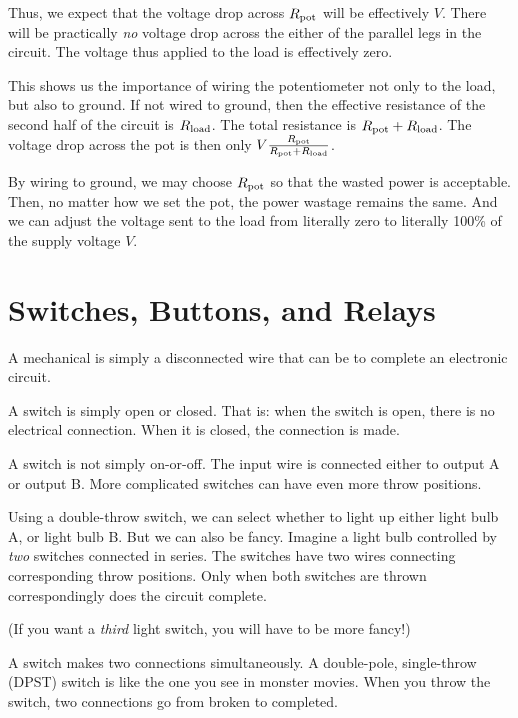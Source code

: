 \documentclass[11pt, oneside]{amsart}
\begin{document}
Thus, we expect that the voltage drop across $R_\text{pot}$ will be effectively
$V$. There will be practically \emph{no} voltage drop across the either
of the parallel legs in the circuit. The voltage thus applied to the
load is effectively zero.

This shows us the importance of wiring the potentiometer not only to the
load, but also to ground. If not wired to ground, then the effective
resistance of the second half of the circuit is $R_\text{load}$. The total
resistance is $R_\text{pot} + R_\text{load}$. The voltage drop across the pot is then
only $V \frac{R_\text{pot}}{R_\text{pot} + R_\text{load}}$.

By wiring to ground, we may choose $R_\text{pot}$ so that the wasted power is
acceptable. Then, no matter how we set the pot, the power wastage
remains the same. And we can adjust the voltage sent to the load from
literally zero to literally 100\% of the supply voltage $V$.

\section{Switches, Buttons, and Relays}

A mechanical  is simply a disconnected wire that can be
 to complete an electronic circuit.

A  switch is simply open or closed. That is: when
the switch is open, there is no electrical connection. When it is
closed, the connection is made.

A  switch is not simply on-or-off. The input wire
is connected either to output A or output B. More complicated switches
can have even more throw positions.

Using a double-throw switch, we can select whether to light up either
light bulb A, or light bulb B. But we can also be fancy. Imagine a light
bulb controlled by \emph{two} switches connected in series. The switches
have two wires connecting corresponding throw positions. Only when both
switches are thrown correspondingly does the circuit complete.

(If you want a \emph{third} light switch, you will have to be more
fancy!)

A  switch makes two connections simultaneously. A
double-pole, single-throw (DPST) switch is like the one you see in
monster movies. When you throw the switch, two connections go from
broken to completed.

\newcommand{\Ain}{A_\text{in}}
\newcommand{\Bin}{B_\text{in}}
\newcommand{\Aout}{A_\text{out}}
\newcommand{\Apout}{A'_\text{out}}
\newcommand{\Bout}{B_\text{out}}
\newcommand{\Bpout}{B'_\text{out}}
\end{document}
